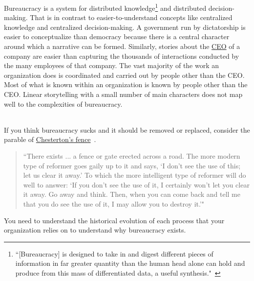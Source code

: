 Bureaucracy is a system for distributed knowledge\footnote{``[Bureaucracy] is designed to take in and digest different pieces of information in far greater quantity than the human head alone can hold and produce from this mass of differentiated data, a useful synthesis."~\cite{1966_Morison}} 
and distributed decision-making. 
That is in contrast to easier-to-understand concepts like centralized knowledge and centralized decision-making. A government run by dictatorship is easier to conceptualize than democracy because there is a central character around which a narrative can be formed. Similarly, stories about the \href{https://en.wikipedia.org/wiki/Chief_executive_officer}{CEO} 
%
\iftoggle{WPinmargin}{\marginpar{$>$Wikipedia: Chief executive officer}}{}
of a company are easier than capturing the thousands of interactions conducted by the many employees of that company. The vast majority of the work an organization does is coordinated and carried out by people other than the CEO. Most of what is known within an organization is known by people other than the CEO. Linear storytelling with a small number of main characters does not map well to the complexities of bureaucracy. 

\ \\

If you think bureaucracy sucks and it should be removed or replaced,  consider the parable of 
\href{https://en.wikipedia.org/wiki/G._K._Chesterton\%23Chesterton\%27s_fence}{Chesterton's fence}~\cite{1929_Chesterton}. 
\label{concept:chestertons_fence}
\iftoggle{WPinmargin}{\marginpar{$>$Wikipedia: Chesterton's fence}}{}
\begin{quote}
``There exists ... a fence or gate erected across a road. The more modern type of reformer goes gaily up to it and says, `I don't see the use of this; let us clear it away.' To which the more intelligent type of reformer will do well to answer: `If you don't see the use of it, I certainly won't let you clear it away. Go away and think. Then, when you can come back and tell me that you do see the use of it, I may allow you to destroy it.'"
\end{quote}
You need to understand the historical evolution of each process that your organization relies on to understand why bureaucracy exists.
